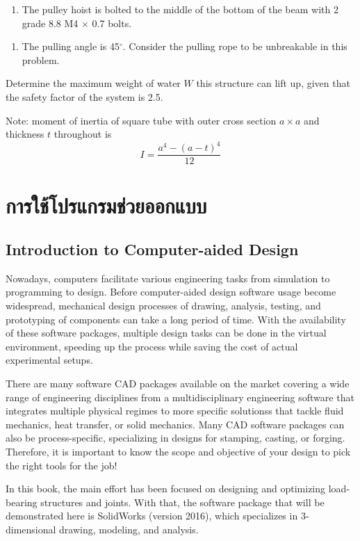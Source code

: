 \documentclass[a4paper,openany,nobib]{tufte-book}
\begin{document}
{{\begin{enumerate}
\item The pulley hoist is bolted to the middle of the bottom of the beam
with 2 grade 8.8 M4 \(\times\) 0.7 bolts.
\end{enumerate}


\begin{enumerate}
\item The pulling angle is 45\(^{\circ}\). Consider the pulling rope to be
unbreakable in this problem.
\end{enumerate}

Determine the maximum weight of water \(W\) this structure can lift up,
given that the safety factor of the system is 2.5.

Note: moment of inertia of square tube with outer cross section
\(a \times a\) and thickness \(t\) throughout is
$$I = \frac{a^4 - (a-t)^4}{12}$$

\chapter{การใช้โปรแกรมช่วยออกแบบ}
\label{the-help}
\section{Introduction to Computer-aided Design}
\label{introduction-to-computer-aided-design}
Nowadays, computers facilitate various engineering tasks from simulation
to programming to design. Before computer-aided design software usage
become widespread, mechanical design processes of drawing, analysis,
testing, and prototyping of components can take a long period of time.
With the availability of these software packages, multiple design tasks
can be done in the virtual environment, speeding up the process while
saving the cost of actual experimental setups.

There are many software CAD packages available on the market covering a
wide range of engineering disciplines from a multidisciplinary
engineering software that integrates multiple physical regimes to more
specific solutionss that tackle fluid mechanics, heat transfer, or solid
mechanics. Many CAD software packages can also be process-specific,
specializing in designs for stamping, casting, or forging. Therefore, it
is important to know the scope and objective of your design to pick the
right tools for the job!

In this book, the main effort has been focused on designing and
optimizing load-bearing structures and joints. With that, the software
package that will be demonstrated here is SolidWorks (version 2016),
which specializes in 3-dimensional drawing, modeling, and analysis.

}}
\end{document}

